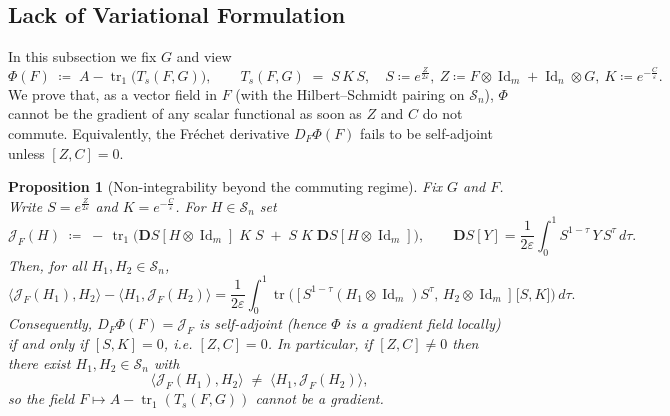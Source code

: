\documentclass[10pt]{article}
\newcommand{\Ss}{\mathcal{S}}
\newcommand{\Id}{\operatorname{Id}}
\newcommand{\tr}{\operatorname{tr}}
\renewcommand{\epsilon}{\varepsilon}
\newcommand{\eqdef}{\coloneqq}
\theoremstyle{plain}
\newtheorem{prop}{Proposition}
\theoremstyle{definition}
\theoremstyle{remark}
\begin{document}
\subsection{Lack of Variational Formulation}
\label{sec:no-gradient}

In this subsection we fix $G$ and view
\[
\Phi(F)\;\eqdef\;A-\tr_1\!\Big(T_s(F,G)\Big),\qquad
T_s(F,G)\;=\;S\,K\,S,\quad S\eqdef e^{\frac{Z}{2\epsilon}},\ Z\eqdef F\otimes\Id_m+\Id_n\otimes G,\ K\eqdef e^{-\frac{C}{\epsilon}}.
\]
We prove that, as a vector field in $F$ (with the Hilbert–Schmidt pairing on $\Ss_n$), $\Phi$ cannot be the gradient of any scalar functional as soon as $Z$ and $C$ do not commute. Equivalently, the Fr\'echet derivative $D_F\Phi(F)$ fails to be self-adjoint unless $[Z,C]=0$.

\begin{prop}[Non-integrability beyond the commuting regime]\label{prop:not-gradient}
Fix $G$ and $F$. Write $S=e^{\frac{Z}{2\epsilon}}$ and $K=e^{-\frac{C}{\epsilon}}$. For $H\in \Ss_n$ set
\[
\mathcal{J}_F(H)\;\eqdef\; -\,\tr_1\!\Big(\mathbf{D}S[H\otimes\Id_m]\;K\;S\;+\;S\;K\;\mathbf{D}S[H\otimes\Id_m]\Big),
\qquad
\mathbf{D}S[Y]=\frac{1}{2\epsilon}\!\int_{0}^{1}\! S^{1-\tau}\,Y\,S^{\tau}\,d\tau .
\]
Then, for all $H_1,H_2\in\Ss_n$,
\begin{equation}\label{eq:skew-bilinear}
\big\langle \mathcal{J}_F(H_1),H_2\big\rangle - \big\langle H_1,\mathcal{J}_F(H_2)\big\rangle
=\frac{1}{2\epsilon}\int_{0}^{1}\tr\!\Big(\,\big[\,S^{1-\tau}(H_1\!\otimes\!\Id_m)S^{\tau},\,H_2\!\otimes\!\Id_m\,\big]\;\big[S,K\big]\Big)\,d\tau .
\end{equation}
Consequently, $D_F\Phi(F)=\mathcal{J}_F$ is self-adjoint (hence $\Phi$ is a gradient field locally) if and only if $[S,K]=0$, i.e. $[Z,C]=0$. In particular, if $[Z,C]\neq 0$ then there exist $H_1,H_2\in \Ss_n$ with
\[
\big\langle \mathcal{J}_F(H_1),H_2\big\rangle \;\neq\; \big\langle H_1,\mathcal{J}_F(H_2)\big\rangle ,
\]
so the field $F\mapsto A-\tr_1(T_s(F,G))$ cannot be a gradient.
\end{prop}
\end{document}
